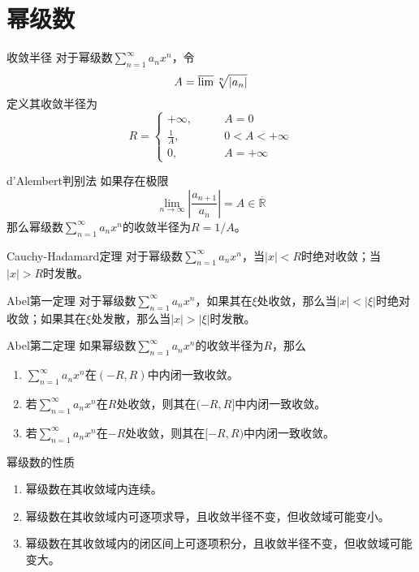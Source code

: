 \documentclass[lang = cn, scheme = chinese, thmcnt = section]{elegantbook}
\newcommand{\R}{\mathbb{R}}            %
\newcommand{\dis}{\displaystyle}
\begin{document}
\section{幂级数}

\begin{definition}{收敛半径}
	对于幂级数$\dis \sum_{n=1}^{\infty}a_nx^n$，令
	$$
	A=\varlimsup \sqrt[n]{|a_n|}
	$$
	定义其收敛半径为
	$$
	R=\begin{cases}
		+\infty,\qquad & A=0\\
		\frac{1}{A},\qquad & 0<A<+\infty\\
		0,\qquad & A=+\infty
	\end{cases}
	$$
\end{definition}

\begin{theorem}{d'Alembert判别法}
	如果存在极限
	$$
	\lim_{n\to\infty}\left| \frac{a_{n+1}}{a_n} \right|=A\in\overline{\R}
	$$
	那么幂级数$\dis \sum_{n=1}^{\infty}a_nx^n$的收敛半径为$R=1/A$。
\end{theorem}

\begin{theorem}{Cauchy-Hadamard定理}
	对于幂级数$\dis \sum_{n=1}^{\infty}a_nx^n$，当$|x|<R$时绝对收敛；当$|x|>R$时发散。
\end{theorem}

\begin{theorem}{Abel第一定理}
	对于幂级数$\dis \sum_{n=1}^{\infty}a_nx^n$，如果其在$\xi$处收敛，那么当$|x|<|\xi|$时绝对收敛；如果其在$\xi$处发散，那么当$|x|>|\xi|$时发散。
\end{theorem}

\begin{theorem}{Abel第二定理}
	如果幂级数$\dis \sum_{n=1}^{\infty}a_nx^n$的收敛半径为$R$，那么
	\begin{enumerate}
		\item $\dis \sum_{n=1}^{\infty}a_nx^n$在$(-R,R)$中内闭一致收敛。
		\item 若$\dis \sum_{n=1}^{\infty}a_nx^n$在$R$处收敛，则其在$(-R,R]$中内闭一致收敛。
		\item 若$\dis \sum_{n=1}^{\infty}a_nx^n$在$-R$处收敛，则其在$[-R,R)$中内闭一致收敛。
	\end{enumerate}
\end{theorem}

\begin{theorem}{幂级数的性质}
	\begin{enumerate}
		\item 幂级数在其收敛域内连续。
		\item 幂级数在其收敛域内可逐项求导，且收敛半径不变，但收敛域可能变小。
		\item 幂级数在其收敛域内的闭区间上可逐项积分，且收敛半径不变，但收敛域可能变大。
	\end{enumerate}
\end{theorem}
\end{document}
